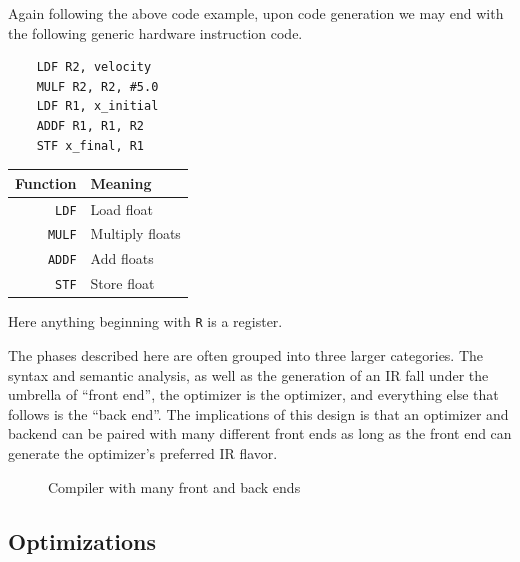 Again following the above code example, upon code generation we may end with the following generic hardware instruction code.

\begin{minipage}{0.5\textwidth}
    \begin{lstlisting}
    LDF R2, velocity
    MULF R2, R2, #5.0
    LDF R1, x_initial
    ADDF R1, R1, R2
    STF x_final, R1
\end{lstlisting}
\end{minipage}
\begin{minipage}{0.5\textwidth}
    \centering
    \begin{tabular}{rl}
        Function      & Meaning         \\ \toprule
        \texttt{LDF}  & Load float      \\
        \texttt{MULF} & Multiply floats \\
        \texttt{ADDF} & Add floats      \\
        \texttt{STF}  & Store float
    \end{tabular}
    \label{fig:machcode}
\end{minipage}
Here anything beginning with \texttt{R} is a register.

The phases described here are often grouped into three larger categories.
The syntax and semantic analysis, as well as the generation of an \ac{IR} fall under the umbrella of ``front end'', the optimizer is the optimizer, and everything else that follows is the ``back end''.
The implications of this design is that an optimizer and backend can be paired with many different front ends as long as the front end can generate the optimizer's preferred \ac{IR} flavor.
\begin{figure}[ht]
    \centering
    
    \caption{Compiler with many front and back ends}\label{fig:compends}
\end{figure}

\subsection{Optimizations}\label{sec:optimizations}

